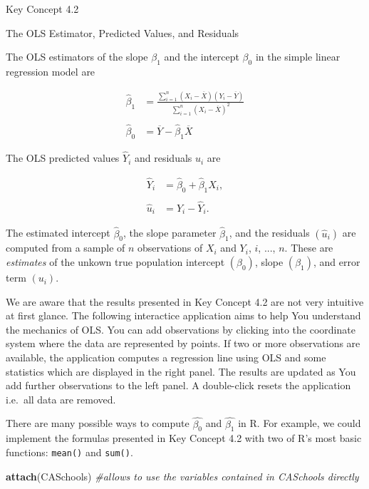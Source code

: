 \documentclass[]{book}
\newenvironment{Shaded}{\begin{snugshade}}{\end{snugshade}}
\newcommand{\KeywordTok}[1]{\textcolor[rgb]{0.13,0.29,0.53}{\textbf{#1}}}
\newcommand{\CommentTok}[1]{\textcolor[rgb]{0.56,0.35,0.01}{\textit{#1}}}
\newcommand{\NormalTok}[1]{#1}
\theoremstyle{definition}
\theoremstyle{definition}
\theoremstyle{definition}
\theoremstyle{remark}
\begin{document}
Key Concept 4.2

The OLS Estimator, Predicted Values, and Residuals

The OLS estimators of the slope \(\beta_1\) and the intercept
\(\beta_0\) in the simple linear regression model are

\begin{align}
  \hat\beta_1 & = \frac{ \sum_{i = 1}^n (X_i - \overline{X})(Y_i - \overline{Y}) } { \sum_{i=1}^n (X_i - \overline{X})^2}  \\
  \\
  \hat\beta_0 & =  \overline{Y} - \hat\beta_1 \overline{X} 
\end{align}

The OLS predicted values \(\widehat{Y}_i\) and residuals \(\hat{u}_i\)
are

\begin{align}
  \widehat{Y}_i & =  \hat\beta_0 + \hat\beta_1 X_i,\\
  \\
  \hat{u}_i & =  Y_i - \widehat{Y}_i. 
\end{align}

The estimated intercept \(\hat{\beta}_0\), the slope parameter
\(\hat{\beta}_1\), and the residuals \(\left(\hat{u}_i\right)\) are
computed from a sample of \(n\) observations of \(X_i\) and \(Y_i\),
\(i\), \(...\), \(n\). These are \emph{estimates} of the unkown true
population intercept \(\left(\beta_0 \right)\), slope
\(\left(\beta_1\right)\), and error term \((u_i)\).

We are aware that the results presented in Key Concept 4.2 are not very
intuitive at first glance. The following interactice application aims to
help You understand the mechanics of OLS. You can add observations by
clicking into the coordinate system where the data are represented by
points. If two or more observations are available, the application
computes a regression line using OLS and some statistics which are
displayed in the right panel. The results are updated as You add further
observations to the left panel. A double-click resets the application
i.e.~all data are removed.

There are many possible ways to compute \(\hat{\beta_0}\) and
\(\hat{\beta_1}\) in R. For example, we could implement the formulas
presented in Key Concept 4.2 with two of R's most basic functions:
\texttt{mean()} and \texttt{sum()}.

\begin{Shaded}
\begin{Highlighting}[]
\KeywordTok{attach}\NormalTok{(CASchools) }\CommentTok{#allows to use the variables contained in CASchools directly}
\end{Highlighting}
\end{Shaded}
\end{document}
